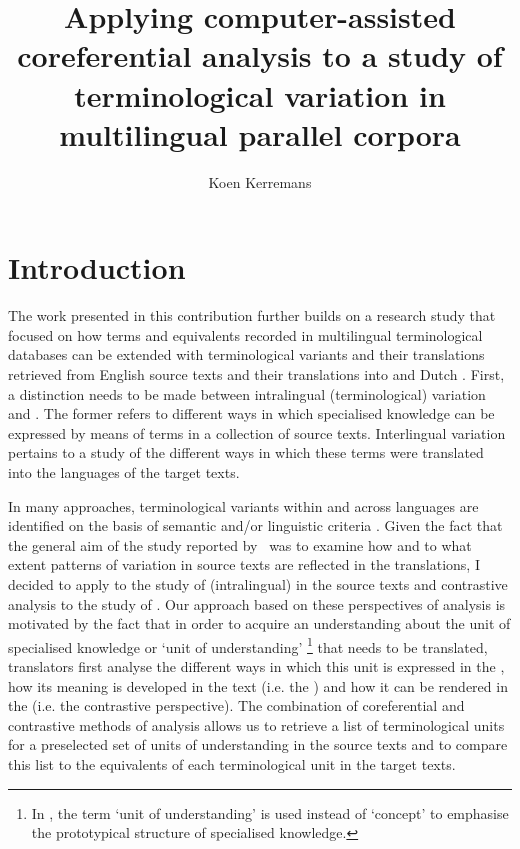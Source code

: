 \documentclass[output=paper]{langsci/langscibook.cls}
\author{Koen Kerremans \affiliation{Vrije Universiteit Brussel}}
\title{Applying computer-assisted coreferential analysis to a study of 
	terminological variation in multilingual parallel corpora}
\begin{document}
\section{Introduction}\label{sec:intro}

The work presented in this contribution further builds on a research study that 
focused on how terms and equivalents recorded in multilingual terminological databases 
can be extended with terminological variants and their translations retrieved from 
English source texts and their translations into  and Dutch \citep{Kerremans2012}. 
First, a distinction needs to be made between intralingual (terminological) variation 
and . The former refers to different ways in which specialised 
knowledge can be expressed by means of terms in a collection of source texts. Interlingual 
variation pertains to a study of the different ways in which these  
terms were translated into the languages of the target texts.

In many  approaches, terminological variants within and across languages are identified on the basis of semantic and/or linguistic criteria \citep{CarrenoCruz2008,FernandezSilva2010}. Given the fact that the general aim of the study 
reported by~\citet{Kerremans2012} was to examine how and to what extent patterns of variation in source texts are reflected in the translations, I decided to apply 
 to the study of (intralingual)  
in the source texts and contrastive analysis to the study of . 
Our approach based on these perspectives of analysis is motivated by the fact that 
in order to acquire an understanding about the unit of specialised knowledge or 
`unit of understanding' \citep{Temmerman2000}\footnote{ In \citep{Temmerman2000}, the term 
`unit of understanding' is used instead of `concept' to emphasise the prototypical 
structure of specialised knowledge.} that needs to be translated, translators first 
analyse the different ways in which this unit is expressed in the , 
how its meaning is developed in the text (i.e. the ) and how 
it can be rendered in the  (i.e. the contrastive perspective). The 
combination of coreferential and contrastive methods of analysis allows us to retrieve 
a list of terminological units for a preselected set of units of understanding 
in the source texts and to compare this list to the equivalents of each terminological 
unit in the target texts.
\end{document}
